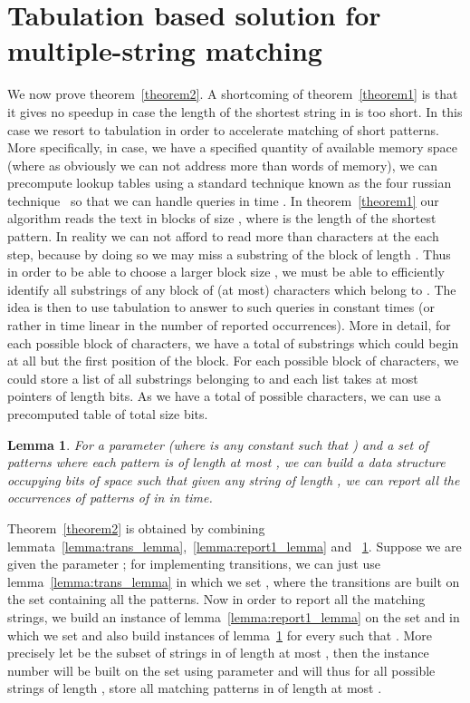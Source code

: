 \documentclass{article}
\newcommand{\?}{\mskip1.5mu}
\newtheorem{lemma}{Lemma}
\begin{document}
\section{Tabulation based solution for multiple-string matching}
\label{section:tabul_sol}
We now prove theorem~\ref{theorem2}. 
A shortcoming of theorem~\ref{theorem1} is that it gives no speedup in case the length of the shortest string in  is too short. In this case we resort to tabulation in order to accelerate matching of short patterns. More specifically, in case, we have a specified quantity  of available memory space (where  as obviously we can not address more than  words of memory), we can precompute lookup tables using a standard technique known as the four russian technique~\cite{ADKF70} so that we can handle queries in time . In theorem~\ref{theorem1} our algorithm reads the text in blocks of size , where  is the length of the shortest pattern. In reality we can not afford to read more than  characters at the each step, because by doing so we may miss a substring of the block of length . Thus in order to be able to choose a larger block size , we must be able to efficiently identify all substrings of any block of (at most)  characters which belong to . The idea is then to use tabulation to answer to such queries in constant times (or rather in time linear in the number of reported occurrences). More in detail, for each possible block of  characters, we have a total of  substrings which could begin at all but the first position of the block. For each possible block of  characters, we could store a list of all substrings belonging to  and each list takes at most  pointers of length  bits. As we have a total of  possible characters, we can use a precomputed table of total size  bits. \begin{lemma}
\label{lemma:report2_lemma}
For a parameter  (where  is any constant such that ) and a set  of patterns where each pattern is of length at most , we can build a data structure occupying  bits of space such that given any string  of length , we can report all the  occurrences of patterns of  in  in  time. 
\end{lemma}
Theorem~\ref{theorem2} is obtained by combining lemmata~\ref{lemma:trans_lemma},~\ref{lemma:report1_lemma} and ~\ref{lemma:report2_lemma}.
Suppose we are given the parameter ; for implementing transitions, we can just use lemma~\ref{lemma:trans_lemma} in which we set , where the transitions are built on the set containing all the patterns. Now in order to report all the matching strings, we build an instance of lemma~\ref{lemma:report1_lemma} on the set  and in which we set  and also build  instances of lemma~\ref{lemma:report2_lemma} for every  such that . More precisely let  be the subset of strings in  of length at most , then the instance number  will be built on the set  using parameter  and will thus for all possible strings of length , store all matching patterns in  of length at most .  
\end{document}

